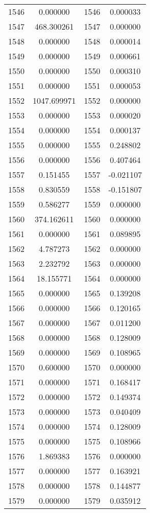 \documentclass[12pt]{article}
\begin{document}
\begin{longtable}{@{}cccc@{}}
1546 & 0.000000 & 1546 & 0.000033 \\
1547 & 468.300261 & 1547 & 0.000000 \\
1548 & 0.000000 & 1548 & 0.000014 \\
1549 & 0.000000 & 1549 & 0.000661 \\
1550 & 0.000000 & 1550 & 0.000310 \\
1551 & 0.000000 & 1551 & 0.000053 \\
1552 & 1047.699971 & 1552 & 0.000000 \\
1553 & 0.000000 & 1553 & 0.000020 \\
1554 & 0.000000 & 1554 & 0.000137 \\
1555 & 0.000000 & 1555 & 0.248802 \\
1556 & 0.000000 & 1556 & 0.407464 \\
1557 & 0.151455 & 1557 & -0.021107 \\
1558 & 0.830559 & 1558 & -0.151807 \\
1559 & 0.586277 & 1559 & 0.000000 \\
1560 & 374.162611 & 1560 & 0.000000 \\
1561 & 0.000000 & 1561 & 0.089895 \\
1562 & 4.787273 & 1562 & 0.000000 \\
1563 & 2.232792 & 1563 & 0.000000 \\
1564 & 18.155771 & 1564 & 0.000000 \\
1565 & 0.000000 & 1565 & 0.139208 \\
1566 & 0.000000 & 1566 & 0.120165 \\
1567 & 0.000000 & 1567 & 0.011200 \\
1568 & 0.000000 & 1568 & 0.128009 \\
1569 & 0.000000 & 1569 & 0.108965 \\
1570 & 0.600000 & 1570 & 0.000000 \\
1571 & 0.000000 & 1571 & 0.168417 \\
1572 & 0.000000 & 1572 & 0.149374 \\
1573 & 0.000000 & 1573 & 0.040409 \\
1574 & 0.000000 & 1574 & 0.128009 \\
1575 & 0.000000 & 1575 & 0.108966 \\
1576 & 1.869383 & 1576 & 0.000000 \\
1577 & 0.000000 & 1577 & 0.163921 \\
1578 & 0.000000 & 1578 & 0.144877 \\
1579 & 0.000000 & 1579 & 0.035912 \\

\end{longtable}
\end{document}
